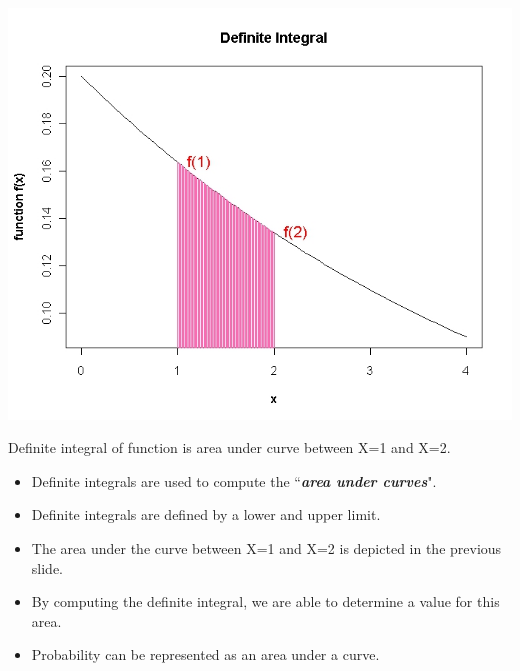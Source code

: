 \documentclass[12pt]{report}
\begin{document}
\vspace{-0.5cm}
\begin{center}
	\includegraphics[scale=0.35]{images/6ADefiniteIntegral}
\end{center}
Definite integral of function is area under curve between X=1 and X=2.
\begin{itemize}
	\item Definite integrals are used to compute the ``\textbf{\textit{area under curves}}".
	\item Definite integrals are defined by a lower and upper limit.
	\item The area under the curve between X=1 and  X=2 is depicted in the previous slide.
	\item By computing the definite integral, we are able to determine a value for this area.
	\item Probability can be represented as an area under a curve.
\end{itemize}
\end{document}
